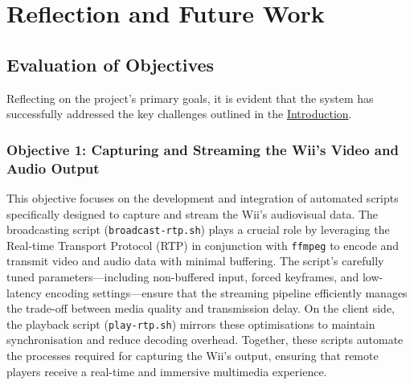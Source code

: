 \section{Reflection and Future Work}



%
\subsection{Evaluation of Objectives}
Reflecting on the project’s primary goals, it is evident that the system has successfully addressed the key challenges outlined in the \hyperlink{chapter:introduction}{Introduction}.

\subsubsection{Objective 1: Capturing and Streaming the Wii's Video and Audio Output}
This objective focuses on the development and integration of automated scripts
specifically designed to capture and stream the Wii's audiovisual data. The
broadcasting script (\texttt{broadcast-rtp.sh}) plays a crucial role by
leveraging the Real-time Transport Protocol (RTP) in conjunction with
\texttt{ffmpeg} to encode and transmit video and audio data with minimal
buffering. The script's carefully tuned parameters—including non-buffered input,
forced keyframes, and low-latency encoding settings—ensure that the streaming
pipeline efficiently manages the trade-off between media quality and
transmission delay. On the client side, the playback script
(\texttt{play-rtp.sh}) mirrors these optimisations to maintain synchronisation
and reduce decoding overhead. Together, these scripts automate the processes
required for capturing the Wii’s output, ensuring that remote players receive a
real-time and immersive multimedia experience.


